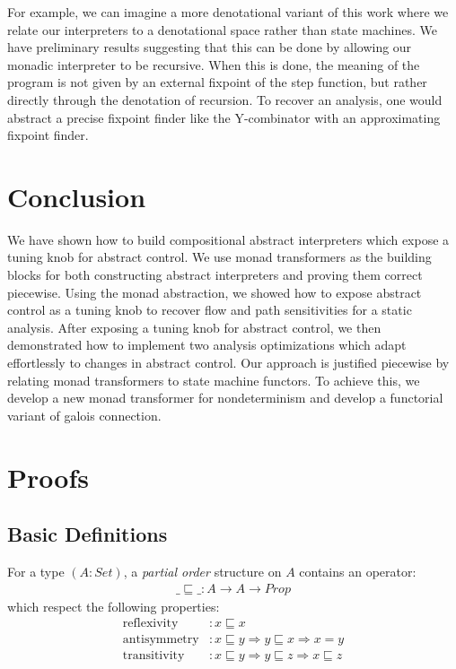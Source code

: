 \documentclass{article}
\begin{document}
For example, we can imagine a more denotational variant of this work where we relate our interpreters to a denotational space rather than state machines.
We have preliminary results suggesting that this can be done by allowing our monadic interpreter to be recursive.
When this is done, the meaning of the program is not given by an external fixpoint of the step function, but rather directly through the denotation of recursion.
To recover an analysis, one would abstract a precise fixpoint finder like the Y-combinator with an approximating fixpoint finder.


\section{Conclusion}
\label{Conclusion}

We have shown how to build compositional abstract interpreters which expose a tuning knob for abstract control.
We use monad transformers as the building blocks for both constructing abstract interpreters and proving them correct piecewise.
Using the monad abstraction, we showed how to expose abstract control as a tuning knob to recover flow and path sensitivities for a static analysis.
After exposing a tuning knob for abstract control, we then demonstrated how to implement two analysis optimizations which adapt effortlessly to changes in abstract control.
Our approach is justified piecewise by relating monad transformers to state machine functors.
To achieve this, we develop a new monad transformer for nondeterminism and develop a functorial variant of galois connection.


\section{Proofs}
\label{section:Proofs}

\subsection{Basic Definitions}
\label{section:Proofs:BasicDefinitions}

\begin{definition}
For a type $(A : Set)$, a \emph{partial order} structure on $A$ contains an operator:
\begin{align*}
\_⊑\_ : A → A → Prop
\end{align*}
which respect the following properties:
\begin{align*}
 \operatorname{reflexivity} &: x ⊑ x                   \\
\operatorname{antisymmetry} &: x ⊑ y ⇒  y ⊑ x ⇒  x = y \\
\operatorname{transitivity} &: x ⊑ y ⇒  y ⊑ z ⇒  x ⊑ z \\
\end{align*}
\end{definition}
\end{document}
